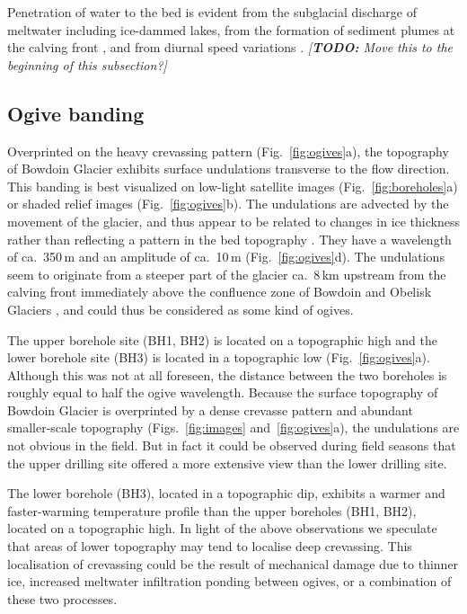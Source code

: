 \documentclass[utf8]{article}
\newcommand{\todo}[1]{\textcolor{c3}{\emph{[\textbf{TODO:} #1]}}}
\begin{document}
    Penetration of water to the bed is evident from the subglacial discharge of
    meltwater including ice-dammed lakes, from the formation of sediment plumes
    at the calving front \citep{Jouvet.etal.2018, Kanna.etal.2018}, and from
    diurnal speed variations \citep{Sugiyama.etal.2014, Podolskiy.etal.2016}.
    \todo{Move this to the beginning of this subsection?}


\subsection{Ogive banding}

    Overprinted on the heavy crevassing pattern (Fig.~\ref{fig:ogives}a), the
    topography of Bowdoin Glacier exhibits surface undulations transverse to
    the flow direction. This banding is best visualized on low-light satellite
    images (Fig.~\ref{fig:boreholes}a) or shaded relief images
    (Fig.~\ref{fig:ogives}b). The undulations are advected
    by the movement of the glacier, and thus appear to be related to changes in
    ice thickness rather than reflecting a pattern in the bed topography
    \citep[Fig.~\ref{fig:ogives}c;][Fig.~3]{Tsutaki.etal.2016}. They have a
    wavelength of ca.~350\,m and an amplitude of ca.~10\,m
    (Fig.~\ref{fig:ogives}d). The undulations seem to originate from a
    steeper part of the glacier ca.~8\,km upstream from the calving front
    immediately above the confluence zone of Bowdoin and Obelisk Glaciers
    \citep[Fig.~\ref{fig:images}a;][Fig.~3]{Tsutaki.etal.2016}, and
    could thus be considered as some kind of ogives.

    The upper borehole site (BH1, BH2) is located on a topographic high and the
    lower borehole site (BH3) is located in a topographic low
    (Fig.~\ref{fig:ogives}a). Although this
    was not at all foreseen, the distance between the two boreholes is roughly
    equal to half the ogive wavelength. Because the surface topography of
    Bowdoin Glacier is overprinted by a dense crevasse pattern and abundant
    smaller-scale topography (Figs.~\ref{fig:images} and~\ref{fig:ogives}a),
    the undulations are not obvious in the field. But in fact it
    could be observed during field seasons that the upper drilling site offered
    a more extensive view than the lower drilling site.

    The lower borehole (BH3), located in a topographic dip, exhibits a warmer
    and faster-warming temperature profile than the upper boreholes (BH1, BH2),
    located on a topographic high. In light of the above observations we
    speculate that areas of lower topography may tend to localise deep
    crevassing. This localisation of crevassing
    could be the result of mechanical damage due to thinner ice, increased
    meltwater infiltration ponding between ogives, or a combination of these
    two processes.
\end{document}
